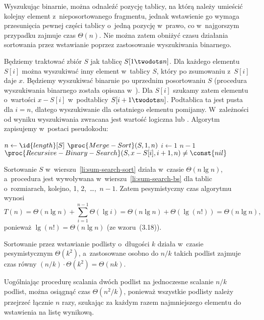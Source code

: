 \exercise %
Wyszukując binarnie, można odnaleźć pozycję tablicy, na którą należy umieścić kolejny element z~nieposortowanego fragmentu, jednak wstawienie go wymaga przesunięcia pewnej części tablicy o~jedną pozycję w~prawo, co w~najgorszym przypadku zajmuje czas $\Theta(n)$. Nie można zatem obniżyć czasu działania sortowania przez wstawianie poprzez zastosowanie wyszukiwania binarnego.

\exercise %
Będziemy traktować zbiór $S$ jak tablicę $S[1\twodots n]$. Dla każdego elementu $S[i]$ można wyszukiwać inny element w~tablicy $S$, który po zsumowaniu z~$S[i]$ daje $x$. Będziemy wyszukiwać binarnie po uprzednim posortowaniu $S$ (procedura wyszukiwania binarnego została opisana w~). Dla $S[i]$ szukamy zatem elementu o~wartości $x-S[i]$ w~podtablicy $S[i+1\twodots n]$. Podtablica ta jest pusta dla $i=n$, dlatego wyszukiwanie dla ostatniego elementu pomijamy. W~zależności od wyniku wyszukiwania zwracana jest wartość logiczna  lub . Algorytm zapisujemy w~postaci pseudokodu:
\begin{codebox}
\li	$n\gets\id{length}[S]$
\li	$\proc{Merge-Sort}(S,1,n)$ \label{li:sum-search-sort}
\li	\For $i\gets1$ \To $n-1$
\li		\Do
			\If $\proc{Recursive-Binary-Search}(S,x-S[i],i+1,n)\ne\const{nil}$ \label{li:sum-search-bs}
\li				\Then \Return {}
				\End
		\End
\li	\Return {}
\end{codebox}

Sortowanie $S$ w~wierszu~\ref{li:sum-search-sort} działa w~czasie $\Theta(n\lg n)$, a~procedura  jest wywoływana w~wierszu~\ref{li:sum-search-bs} dla tablic o~rozmiarach, kolejno, 1, 2,~\dots,~$n-1$. Zatem pesymistyczny czas algorytmu  wynosi
\[
	T(n) = \Theta(n\lg n)+\sum_{i=1}^{n-1}\Theta(\lg i) = \Theta(n\lg n)+\Theta(\lg(n!)) = \Theta(n\lg n),
\]
ponieważ $\lg(n!)=\Theta(n\lg n)$ (ze wzoru~(3.18)).

\problems


\subproblem %
Sortowanie przez wstawianie podlisty o~długości $k$ działa w~czasie pesymistycznym $\Theta(k^2)$, a~zastosowane osobno do $n/k$ takich podlist zajmuje czas równy $(n/k)\cdot\Theta(k^2)=\Theta(nk)$.

\subproblem %
Uogólniając procedurę scalania dwóch podlist na jednoczesne scalanie $n/k$ podlist, można osiągnąć czas $\Theta(n^2\!/k)$, ponieważ wszystkie podlisty należy przejrzeć łącznie $n$ razy, szukając za każdym razem najmniejszego elementu do wstawienia na listę wynikową.

